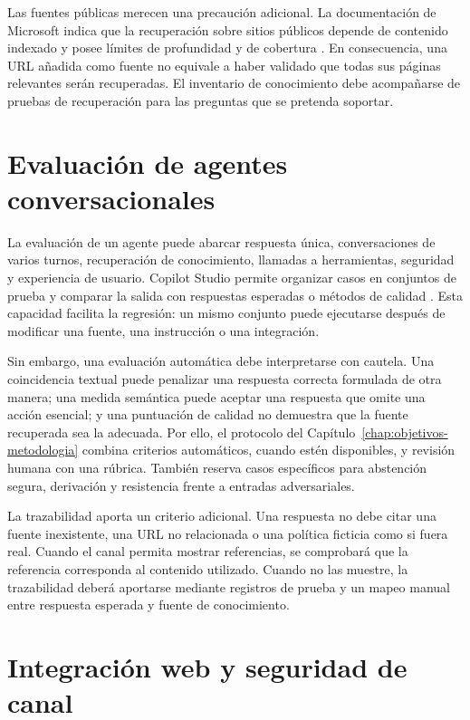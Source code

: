 \documentclass[12pt,twoside,titlepage]{book}
\begin{document}
Las fuentes públicas merecen una precaución adicional. La documentación de
Microsoft indica que la recuperación sobre sitios públicos depende de contenido
indexado y posee límites de profundidad y de cobertura \cite{copilotPublicWeb}.
En consecuencia, una URL añadida como fuente no equivale a haber validado que
todas sus páginas relevantes serán recuperadas. El inventario de conocimiento
debe acompañarse de pruebas de recuperación para las preguntas que se pretenda
soportar.

\section{Evaluación de agentes conversacionales}
\label{sec:evaluacion-agentes}

La evaluación de un agente puede abarcar respuesta única, conversaciones de
varios turnos, recuperación de conocimiento, llamadas a herramientas, seguridad
y experiencia de usuario. Copilot Studio permite organizar casos en conjuntos de
prueba y comparar la salida con respuestas esperadas o métodos de calidad
\cite{copilotEvaluation}. Esta capacidad facilita la regresión: un mismo conjunto
puede ejecutarse después de modificar una fuente, una instrucción o una
integración.

Sin embargo, una evaluación automática debe interpretarse con cautela. Una
coincidencia textual puede penalizar una respuesta correcta formulada de otra
manera; una medida semántica puede aceptar una respuesta que omite una acción
esencial; y una puntuación de calidad no demuestra que la fuente recuperada sea
la adecuada. Por ello, el protocolo del Capítulo~\ref{chap:objetivos-metodologia}
combina criterios automáticos, cuando estén disponibles, y revisión humana con
una rúbrica. También reserva casos específicos para abstención segura,
derivación y resistencia frente a entradas adversariales.

La trazabilidad aporta un criterio adicional. Una respuesta no debe citar una
fuente inexistente, una URL no relacionada o una política ficticia como si fuera
real. Cuando el canal permita mostrar referencias, se comprobará que la
referencia corresponda al contenido utilizado. Cuando no las muestre, la
trazabilidad deberá aportarse mediante registros de prueba y un mapeo manual
entre respuesta esperada y fuente de conocimiento.

\section{Integración web y seguridad de canal}
\label{sec:integracion-web}
\end{document}
